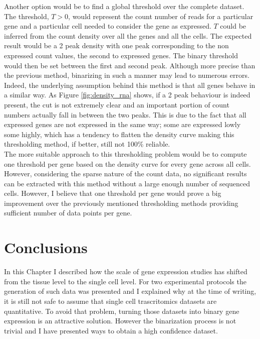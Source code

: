   Another option would be to find a global threshold over the complete dataset. The threshold, $T>0$, would represent the count number of reads for a particular gene and a particular cell needed to consider the gene as expressed. $T$ could be inferred from the count density over all the genes and all the cells. The expected result would be a 2 peak density with one peak corresponding to the non expressed count values, the second to expressed genes. The binary threshold would then be set between the first and second peak. Although more precise than the previous method, binarizing in such a manner may lead to numerous errors. Indeed, the underlying assumption behind this method is that all genes behave in a similar way. As Figure \ref{fig:density_rna} shows, if a 2 peak behaviour is indeed present, the cut is not extremely clear and an important portion of count numbers actually fall in between the two peaks. This is due to the fact that all expressed genes are not expressed in the same way; some are expressed lowly some highly, which has a tendency to flatten the density curve making this thresholding method, if better, still not 100\% reliable.\\
  
  The more suitable approach to this thresholding problem would be to compute one threshold per gene based on the density curve for every gene across all cells. However, considering the sparse nature of the count data, no significant results can be extracted with this method without a large enough number of sequenced cells. However, I believe that one threshold per gene would prove a big improvement over the previously mentioned thresholding methods providing sufficient number of data points per gene.



\section{Conclusions}
In this Chapter I described how the scale of gene expression studies has shifted from the tissue level to the single cell level. For two experimental protocols the generation of such data was presented and I explained why at the time of writing, it is still not safe to assume that single cell trascritomics datasets are quantitative. To avoid that problem, turning those datasets into binary gene expression is an attractive solution. However the binarization process is not trivial and I have presented ways to obtain a high confidence dataset.\\

